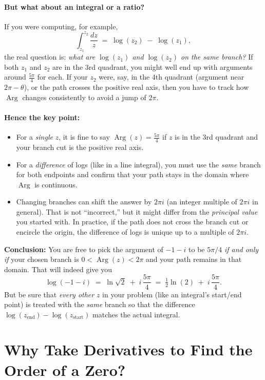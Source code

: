 \documentclass[12pt]{article}
\DeclareMathOperator{\Arg}{Arg}
\theoremstyle{definition} %
\theoremstyle{plain} %
\begin{document}
\paragraph{But what about an integral or a ratio?}
If you were computing, for example,
\[
\int_{z_1}^{z_2} \frac{dz}{z}
\;=\;
\log(z_2) \;-\;\log(z_1),
\]
the real question is: \emph{what are $\log(z_1)$ and $\log(z_2)$ \emph{on the same branch}?}  If both $z_1$ and $z_2$ are in the 3rd quadrant, you might well end up with arguments around $\tfrac{5\pi}{4}$ for each.  If your $z_2$ were, say, in the 4th quadrant (argument near $2\pi - \theta$), or the path crosses the positive real axis, then you have to track how $\Arg$ changes consistently to avoid a jump of $2\pi$.

\paragraph{Hence the key point:}
\begin{itemize}
\item For a \emph{single} $z$, it is fine to say $\Arg(z)=\tfrac{5\pi}{4}$ if $z$ is in the 3rd quadrant and your branch cut is the positive real axis.
\item For a \emph{difference} of logs (like in a line integral), you must use the \emph{same} branch for both endpoints and confirm that your path stays in the domain where $\Arg$ is continuous.  
\item Changing branches can shift the answer by $2\pi i$ (an integer multiple of $2\pi i$ in general).  That is not ``incorrect,'' but it might differ from the \emph{principal value} you started with.  In practice, if the path does not cross the branch cut or encircle the origin, the difference of logs is unique up to a multiple of $2\pi i$.
\end{itemize}

\noindent
\textbf{Conclusion:} You are free to pick the argument of $-1 - i$ to be $5\pi/4$ \emph{if and only if} your chosen branch is $0<\Arg(z)<2\pi$ and your path remains in that domain.  That will indeed give you
\[
\log(-1 - i)
\;=\;
\ln\sqrt{2}
\;+\;
i\,\frac{5\pi}{4}
\;=\;
\tfrac12\ln(2)
\;+\;
i\,\frac{5\pi}{4}.
\]
But be sure that \emph{every other} $z$ in your problem (like an integral's start/end point) is treated with the \emph{same} branch so that the difference 
\(
\log(z_{\text{end}})-\log(z_{\text{start}})
\)
matches the actual integral.  
\section*{Why Take Derivatives to Find the Order of a Zero?}
\end{document}
